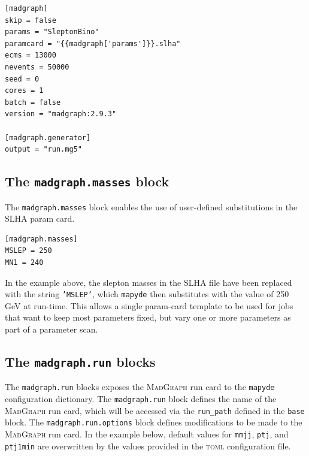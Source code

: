 \documentclass{article}
\newcommand{\mapyde}{\texttt{mapyde}}
\newcommand{\madgraph}{\textsc{MadGraph}}
\newcommand{\toml}{\textsc{toml}}
\begin{document}
\begin{listing}[H]
	\begin{verbatim}
[madgraph]
skip = false
params = "SleptonBino"
paramcard = "{{madgraph['params']}}.slha"
ecms = 13000
nevents = 50000
seed = 0
cores = 1
batch = false
version = "madgraph:2.9.3"

[madgraph.generator]
output = "run.mg5"
        \end{verbatim}
	\caption{The \texttt{madgraph} block of an example \toml{} configuration file for generating slepton events.}
	\label{slepton-config-madgraph}
\end{listing}


\subsection{The \texttt{madgraph.masses} block}
\label{ssec:the-madgraph-masses-block}

The \texttt{madgraph.masses} block enables the use of user-defined substitutions in the SLHA param card.

\begin{listing}[H]
	\begin{verbatim}
[madgraph.masses]
MSLEP = 250
MN1 = 240
        \end{verbatim}
	\caption{The \texttt{madgraph.masses} block of an example \toml{} configuration file for generating slepton events.}
	\label{slepton-config-masses}
\end{listing}

In the example above, the slepton masses in the SLHA file have been replaced with the string \texttt{'MSLEP'}, which \mapyde{} then substitutes with the value of 250 GeV at run-time.  This allows a single param-card template to be used for jobs that want to keep most parameters fixed, but vary one or more parameters as part of a parameter scan.

\subsection{The \texttt{madgraph.run} blocks}
\label{ssec:the-madgraph-run-blocks}

The \texttt{madgraph.run} blocks exposes the \madgraph{} run card to the \mapyde{} configuration dictionary.  The \texttt{madgraph.run} block defines the name of the \madgraph{} run card, which will be accessed via the \texttt{run\_path} defined in the \texttt{base} block.  The \texttt{madgraph.run.options} block defines modifications to be made to the \madgraph{} run card.  In the example below, default values for \texttt{mmjj}, \texttt{ptj}, and \texttt{ptj1min} are overwritten by the values provided in the \toml{} configuration file.
\end{document}
